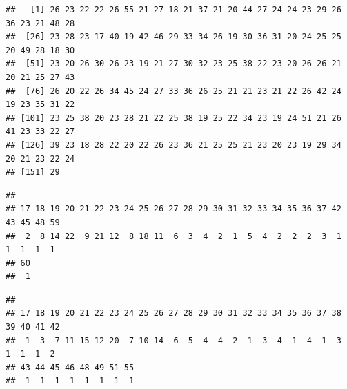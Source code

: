 \documentclass[
]{article}
\newenvironment{Shaded}{\begin{snugshade}}{\end{snugshade}}
\newcommand{\FunctionTok}[1]{\textcolor[rgb]{0.00,0.00,0.00}{#1}}
\newcommand{\NormalTok}[1]{#1}
\newcommand{\SpecialCharTok}[1]{\textcolor[rgb]{0.00,0.00,0.00}{#1}}
\begin{document}
\begin{Shaded}
\end{Shaded}

\begin{verbatim}
##   [1] 26 23 22 22 26 55 21 27 18 21 37 21 20 44 27 24 24 23 29 26 36 23 21 48 28
##  [26] 23 28 23 17 40 19 42 46 29 33 34 26 19 30 36 31 20 24 25 25 20 49 28 18 30
##  [51] 23 20 26 30 26 23 19 21 27 30 32 23 25 38 22 23 20 26 26 21 20 21 25 27 43
##  [76] 26 20 22 26 34 45 24 27 33 36 26 25 21 21 23 21 22 26 42 24 19 23 35 31 22
## [101] 23 25 38 20 23 28 21 22 25 38 19 25 22 34 23 19 24 51 21 26 41 23 33 22 27
## [126] 39 23 18 28 22 20 22 26 23 36 21 25 25 21 23 20 23 19 29 34 20 21 23 22 24
## [151] 29
\end{verbatim}

\begin{Shaded}
\end{Shaded}

\begin{verbatim}
## 
## 17 18 19 20 21 22 23 24 25 26 27 28 29 30 31 32 33 34 35 36 37 42 43 45 48 59 
##  2  8 14 22  9 21 12  8 18 11  6  3  4  2  1  5  4  2  2  2  3  1  1  1  1  1 
## 60 
##  1
\end{verbatim}

\begin{Shaded}
\end{Shaded}

\begin{verbatim}
## 
## 17 18 19 20 21 22 23 24 25 26 27 28 29 30 31 32 33 34 35 36 37 38 39 40 41 42 
##  1  3  7 11 15 12 20  7 10 14  6  5  4  4  2  1  3  4  1  4  1  3  1  1  1  2 
## 43 44 45 46 48 49 51 55 
##  1  1  1  1  1  1  1  1
\end{verbatim}

\begin{Shaded}
\end{Shaded}
\end{document}
